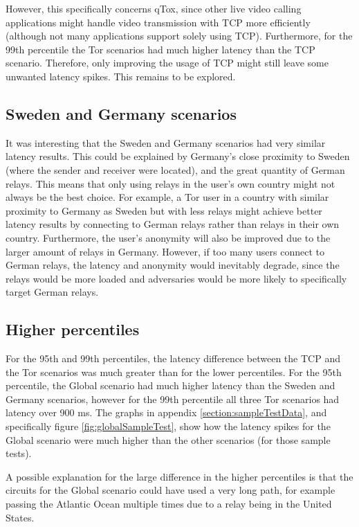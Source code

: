 \documentclass{kththesis}
\begin{document}
However, this specifically concerns qTox, since other live video calling applications might handle video transmission with TCP more efficiently (although not many applications support solely using TCP). Furthermore, for the 99th percentile the Tor scenarios had much higher latency than the TCP scenario. Therefore, only improving the usage of TCP might still leave some unwanted latency spikes. This remains to be explored.

\subsection{Sweden and Germany scenarios}
It was interesting that the Sweden and Germany scenarios had very similar latency results. This could be explained by Germany's close proximity to Sweden (where the sender and receiver were located), and the great quantity of German relays. This means that only using relays in the user's own country might not always be the best choice. For example, a Tor user in a country with similar proximity to Germany as Sweden but with less relays might achieve better latency results by connecting to German relays rather than relays in their own country. Furthermore, the user's anonymity will also be improved due to the larger amount of relays in Germany. However, if too many users connect to German relays, the latency and anonymity would inevitably degrade, since the relays would be more loaded and adversaries would be more likely to specifically target German relays.

\subsection{Higher percentiles}
For the 95th and 99th percentiles, the latency difference between the TCP and the Tor scenarios was much greater than for the lower percentiles. For the 95th percentile, the Global scenario had much higher latency than the Sweden and Germany scenarios, however for the 99th percentile all three Tor scenarios had latency over 900 ms. The graphs in appendix \ref{section:sampleTestData}, and specifically figure \ref{fig:globalSampleTest}, show how the latency spikes for the Global scenario were much higher than the other scenarios (for those sample tests). 

A possible explanation for the large difference in the higher percentiles is that the circuits for the Global scenario could have used a very long path, for example passing the Atlantic Ocean multiple times due to a relay being in the United States.
\end{document}
